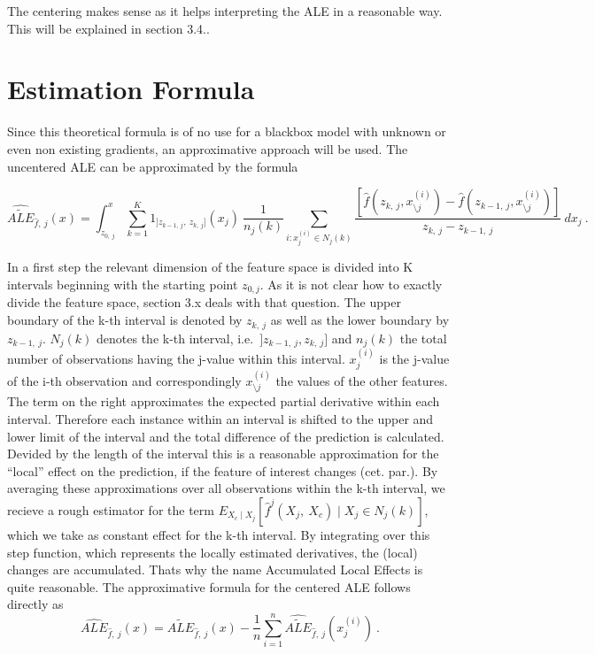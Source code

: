 \documentclass[
]{krantz}
\begin{document}
The centering makes sense as it helps interpreting the ALE in a reasonable way. This will be explained in section 3.4..

\hypertarget{estimation-formula}{%
\section{Estimation Formula}\label{estimation-formula}}

Since this theoretical formula is of no use for a blackbox model with unknown or even non existing gradients, an approximative approach will be used.
The uncentered ALE can be approximated by the formula

\[ \widehat{\widetilde{ALE}}_{\hat{f},~j}(x) = \int_{z_{0,~j}}^{x} \sum_{k=1}^{K}   1_{]z_{k-1,~j},~z_{k,~j}]}(x_j)~ \frac{1}{n_j(k)}\sum_{i:x_j^{(i)}\in N_j(k)} \frac{[\hat{f}(z_{k,~j}, x_{\setminus j}^{(i)})-\hat{f}(z_{k-1,~j}, x_{\setminus j}^{(i)})]}{z_{k,~j}-z_{k-1,~j}}~dx_j~.  \]

In a first step the relevant dimension of the feature space is divided into K intervals beginning with the starting point \(z_{0, j}\). As it is not clear how to exactly divide the feature space, section 3.x deals with that question. The upper boundary of the k-th interval is denoted by \(z_{k, ~j}\) as well as the lower boundary by \(z_{k-1, ~j}\). \(N_j(k)\) denotes the k-th interval, i.e.~\(]z_{k-1,~j}, z_{k,~j}]\) and \(n_j(k)\) the total number of observations having the j-value within this interval. \(x_j^{(i)}\) is the j-value of the i-th observation and correspondingly \(x_{\setminus j}^{(i)}\) the values of the other features. The term on the right approximates the expected partial derivative within each interval.
Therefore each instance within an interval is shifted to the upper and lower limit of the interval and the total difference of the prediction is calculated. Devided by the length of the interval this is a reasonable approximation for the ``local'' effect on the prediction, if the feature of interest changes (cet. par.).
By averaging these approximations over all observations within the k-th interval, we recieve a rough estimator for the term \(E_{X_c \mid X_j} [\hat{f}^j(X_j,~X_c)\mid X_j \in N_j(k)]\), which we take as constant effect for the k-th interval.
By integrating over this step function, which represents the locally estimated derivatives, the (local) changes are accumulated. Thats why the name Accumulated Local Effects is quite reasonable.
The approximative formula for the centered ALE follows directly as
\[   \widehat{ALE}_{\hat{f},~j}(x) = \widehat{\widetilde{ALE}}_{\hat{f},~j}(x) - \frac{1}{n} \sum_{i=1}^{n} \widehat{\widetilde{ALE}}_{\hat{f},~j}(x_j^{(i)})~. 
 \]
\end{document}
